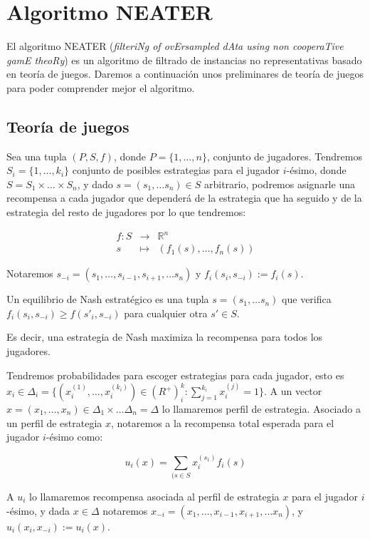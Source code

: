 \section{Algoritmo NEATER}
El algoritmo NEATER (\textit{filteriNg of ovErsampled dAta using non cooperaTive gamE theoRy}) es un algoritmo de filtrado 
de instancias no representativas basado en teoría de juegos. Daremos a continuación unos preliminares de teoría de juegos
para poder comprender mejor el algoritmo.

\subsection{Teoría de juegos}
Sea una tupla $(P, S, f)$, donde $P=\{1, \ldots, n\}$, conjunto de jugadores. Tendremos $S_i=\{1, \ldots, k_i\}$ conjunto
de posibles estrategias para el jugador $i$-ésimo, donde $S = S_1 \times \ldots \times S_n$, y dado $s = (s_1, \ldots s_n) \in S$
arbitrario, podremos asignarle una recompensa a cada jugador que dependerá de la estrategia que ha seguido y de la estrategia del
resto de jugadores por lo que tendremos:

\[\begin{array}{rll}
   f: S &\longrightarrow& \mathbb{R}^n\\
   s &\longmapsto& (f_1(s), \ldots, f_n(s))
  \end{array}\]
  
Notaremos $s_{-i} = (s_1, \ldots, s_{i-1}, s_{i+1}, \ldots s_n)$ y $f_i(s_i, s_{-i}):= f_i(s)$.

\begin{definition}
Un equilibrio de Nash estratégico es una tupla $s = (s_1, \ldots s_n)$ que verifica $f_i(s_i, s_{-i}) \ge f(s'_{i}, s_{-i})$ 
para cualquier otra $s'\in S$.
\end{definition}

Es decir, una estrategia de Nash maximiza la recompensa para todos los jugadores.

Tendremos probabilidades para escoger estrategias para cada jugador, esto es 
$x_i \in \Delta_i = \{(x_i^{(1)}, \ldots, x_i^{(k_i)}) \in (R^{+})^k_i : \sum_{j=1}^{k_i} x_i^{(j)} = 1\}$. A un vector 
$x = (x_1, \ldots, x_n) \in \Delta_1 \times \ldots \Delta_n = \Delta$ lo llamaremos perfil de estrategia. Asociado a un perfil de
estrategia $x$, notaremos a la recompensa total esperada para el jugador $i$-ésimo como:

\[u_i(x) = \sum_{(s\in S} x_i^{(s_1)} f_i(s)\]

A $u_i$ lo llamaremos recompensa asociada al perfil de estrategia $x$ para el jugador $i$-ésimo, y dada $x\in \Delta$ notaremos
$x_{-i} = (x_1, \ldots, x_{i-1}, x_{i+1}, \ldots x_n)$, y $u_i(x_i, x_{-i}):= u_i(x)$.

